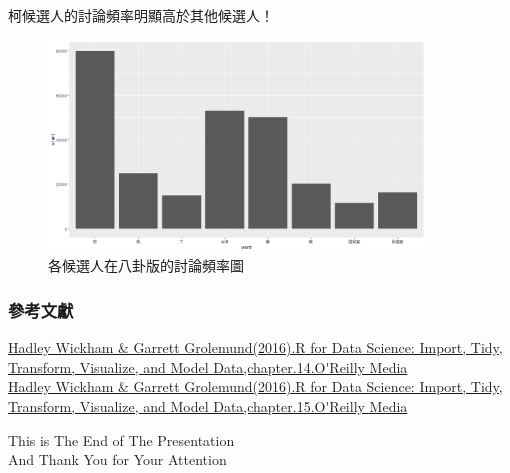 \documentclass[utf8]{beamer}
\begin{document}
\begin{CJK}{UTF8}{bsmi}
\begin{frame}[fragile]
\frametitle{}
柯候選人的討論頻率明顯高於其他候選人！
\begin{figure}
       \includegraphics[width=10cm]{plot.png}
      \caption{\label{1}各候選人在八卦版的討論頻率圖}
\end{figure}
\end{frame}


\begin{frame}
\frametitle{參考文獻}
\href{https://r4ds.had.co.nz/strings.html}
    {\url{Hadley Wickham & Garrett Grolemund(2016).R for Data Science: Import, Tidy, Transform, Visualize, and Model Data,chapter.14.O'Reilly Media}}\\
\href{https://r4ds.had.co.nz/factors.html}
    {\url{Hadley Wickham & Garrett Grolemund(2016).R for Data Science: Import, Tidy, Transform, Visualize, and Model Data,chapter.15.O'Reilly Media}}\\
\end{frame}

\begin{frame}
\begin{center}
This is \alert{The End} of The Presentation\\
And \alert{Thank You} for Your Attention
\end{center}
\end{frame}

\end{CJK}
\end{document}
